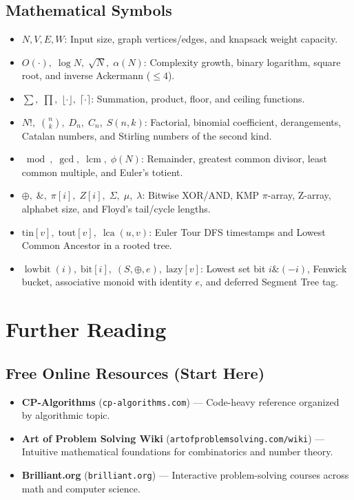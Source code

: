 \documentclass[11pt,a4paper]{article}
\begin{document}
\subsection*{Mathematical Symbols}
\begin{itemize}[itemsep=2pt]
    \item $N, V, E, W$: Input size, graph vertices/edges, and knapsack weight capacity.
    \item $O(\cdot),\; \log N,\; \sqrt{N},\; \alpha(N)$: Complexity growth, binary logarithm, square root, and inverse Ackermann ($\le 4$).
    \item $\sum,\; \prod,\; \lfloor \cdot \rfloor,\; \lceil \cdot \rceil$: Summation, product, floor, and ceiling functions.
    \item $N!,\; \binom{n}{k},\; D_n,\; C_n,\; S(n,k)$: Factorial, binomial coefficient, derangements, Catalan numbers, and Stirling numbers of the second kind.
    \item $\bmod,\; \gcd,\; \operatorname{lcm},\; \phi(N)$: Remainder, greatest common divisor, least common multiple, and Euler's totient.
    \item $\oplus,\; \mathbin{\&},\; \pi[i],\; Z[i],\; \Sigma,\; \mu,\; \lambda$: Bitwise XOR/AND, KMP $\pi$-array, Z-array, alphabet size, and Floyd's tail/cycle lengths.
    \item $\text{tin}[v],\; \text{tout}[v],\; \operatorname{lca}(u, v)$: Euler Tour DFS timestamps and Lowest Common Ancestor in a rooted tree.
    \item $\operatorname{lowbit}(i),\; \text{bit}[i],\; (S, \oplus, e),\; \text{lazy}[v]$: Lowest set bit $i \mathbin{\&} (-i)$, Fenwick bucket, associative monoid with identity $e$, and deferred Segment Tree tag.
\end{itemize}

\section{Further Reading}

\subsection*{Free Online Resources (Start Here)}
\begin{itemize}
    \item \textbf{CP-Algorithms} (\texttt{cp-algorithms.com}) --- Code-heavy reference organized by algorithmic topic.
    \item \textbf{Art of Problem Solving Wiki} (\texttt{artofproblemsolving.com/wiki}) --- Intuitive mathematical foundations for combinatorics and number theory.
    \item \textbf{Brilliant.org} (\texttt{brilliant.org}) --- Interactive problem-solving courses across math and computer science.
\end{itemize}
\end{document}
